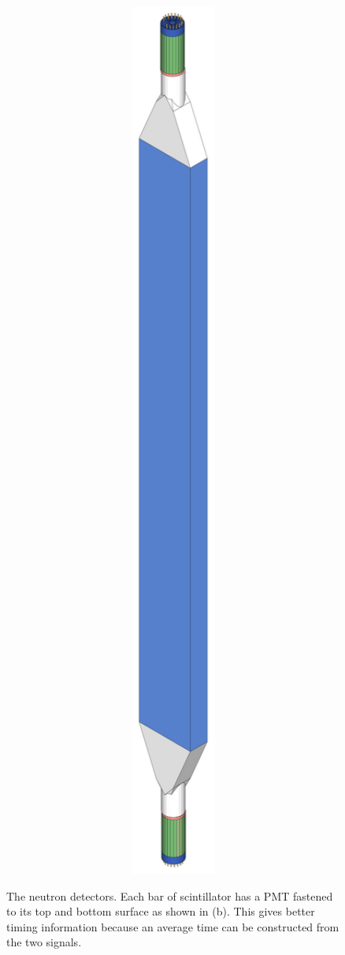 \begin{figure}[htp]
{   \includegraphics[width=1.0\textwidth]{figures/oneNeutronDetector.eps}
}
\label{fig:detectorGeometry}
\caption{The neutron detectors.  Each bar of scintillator has a PMT fastened to its top and bottom surface as shown in (b).  This gives better timing information because an average time can be constructed from the two signals.}
\end{figure}

